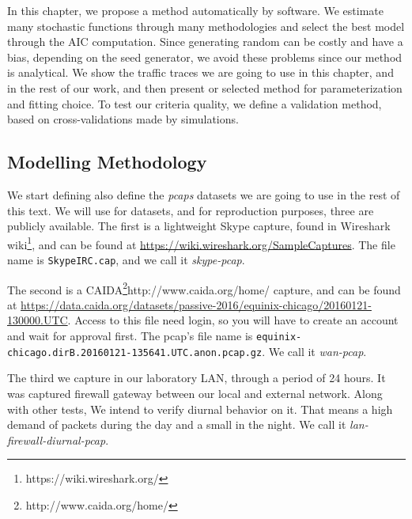 In this chapter, we propose a method automatically by software. We estimate many stochastic functions through many methodologies and select the best model through the AIC computation\cite{bic-aic-comparision}. Since generating random can be costly and have a bias, depending on the seed generator, we avoid these problems since our method is analytical. We show the traffic traces we are going to use in this chapter, and in the rest of our work, and then present or selected method for parameterization and fitting choice. To test our criteria quality, we define a validation method, based on cross-validations made by simulations.


\subsection{Modelling Methodology}

We start defining also define the \textit{pcaps} datasets we are going to use in the rest of this text. We will use for datasets, and for reproduction purposes, three are publicly available. 
The first is a lightweight Skype capture, found in  Wireshark wiki\footnote{https://wiki.wireshark.org/}, and can be found at \href{https://wiki.wireshark.org/SampleCaptures}{https://wiki.wireshark.org/SampleCaptures}. The file name is \texttt{SkypeIRC.cap}, and we call it \textit{skype-pcap}.

The second is a CAIDA\footnote{http://www.caida.org/home/}{http://www.caida.org/home/} capture, and can be found at  \href{https://data.caida.org/datasets/passive-2016/equinix-chicago/20160121-130000.UTC}{https://data.caida.org/datasets/passive-2016/equinix-chicago/20160121-130000.UTC}. Access to this file need login, so you will have to create an account and wait for approval first. The pcap's file name is \texttt{equinix-chicago.dirB.20160121-135641.UTC.anon.pcap.gz}. We call it \textit{wan-pcap}.

The third we capture in our laboratory LAN, through a period of 24 hours. It was captured firewall gateway between our local and external network. Along with other tests, We intend to verify diurnal behavior on it. That means a high demand of packets during the day and a small in the night. We call it \textit{lan-firewall-diurnal-pcap}.

